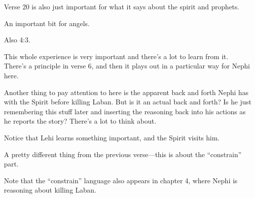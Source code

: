 \begin{compactdesc}
\begin{compactitem}
					\item Verse 20 is also just important for what it says about the spirit and prophets.
				\end{compactitem}
			\item[{\hyperref[1NEPHI-3-29]{1 Nephi 3:29}}] \phantom{.}
				\begin{compactitem}
					\item An important bit for angels.
					\item Also 4:3.
				\end{compactitem}
			\item[{\hyperref[1NEPHI-4-6]{1 Nephi 4:6--38}}] \phantom{.}
				\begin{compactitem}
					\item This whole experience is very important and there's a lot to learn from it. There's a principle in verse 6, and then it plays out in a particular way for Nephi here.
					\item Another thing to pay attention to here is the apparent back and forth Nephi has with the Spirit before killing Laban. But is it an actual back and forth? Is he just remembering this stuff later and inserting the reasoning back into his actions as he reports the story? There's a lot to think about.
				\end{compactitem}
			\item[{\hyperref[1NEPHI-5-4]{1 Nephi 5:4}}]
			\item[{\hyperref[1NEPHI-5-17]{1 Nephi 5:17}}] \phantom{.}
				\begin{compactitem}
					\item Notice that Lehi learns something important, and the Spirit visits him.
				\end{compactitem}
			\item[{\hyperref[1NEPHI-7-14]{1 Nephi 7:14}}]
			\item[{\hyperref[1NEPHI-7-15]{1 Nephi 7:15}}] \phantom{.}
				\begin{compactitem}
					\item A pretty different thing from the previous verse---this is about the ``constrain'' part.
					\item Note that the ``constrain'' language also appears in chapter 4, where Nephi is reasoning about killing Laban.
				\end{compactitem}
			\item[{\hyperref[1NEPHI-10-11]{1 Nephi 10:11}}]
			\item[{\hyperref[1NEPHI-10-17]{1 Nephi 10:17--19}}] \phantom{.}

\end{compactdesc}
